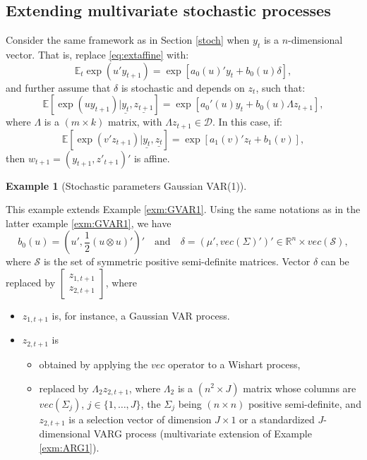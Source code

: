 \documentclass[
  12pt,
]{book}
\providecommand{\tightlist}{%
  \setlength{\itemsep}{0pt}\setlength{\parskip}{0pt}}
\theoremstyle{definition}
\theoremstyle{definition}
\newtheorem{example}{Example}[chapter]
\theoremstyle{definition}
\theoremstyle{definition}
\theoremstyle{remark}
\begin{document}
\hypertarget{extending-multivariate-stochastic-processes}{%
\subsection{Extending multivariate stochastic processes}\label{extending-multivariate-stochastic-processes}}

Consider the same framework as in Section \ref{stoch} when \(y_t\) is a \(n\)-dimensional vector. That is, replace \eqref{eq:extaffine} with:
\begin{equation}
\mathbb{E}_t   \exp(u' y_{t+1}) = \exp[a_0(u)'y_t+b_0(u)\delta],\label{eq:Multiextaffine}
\end{equation}
and further assume that \(\delta\) is stochastic and depends on \(z_t\), such that:
\[
\mathbb{E}[\exp(u y_{t+1})|\underline{y_t}, \underline{z_{t+1}}] = \exp[a_0'(u)y_t+b_0(u)\Lambda z_{t+1}],
\]
where \(\Lambda\) is a \((m\times k)\) matrix, with \(\Lambda z_{t+1} \in \mathcal{D}\). In this case, if:
\[
\mathbb{E}[\exp(v' z_{t+1})|\underline{y_t}, \underline{z_{t}}] = \exp[a_1(v)'z_t+b_1(v)],
\]
then \(w_{t+1} = (y_{t+1}, z'_{t+1})'\) is affine.

\begin{example}[Stochastic parameters Gaussian VAR(1)]
\protect\hypertarget{exm:RSVAR}{}\label{exm:RSVAR}

This example extends Example \ref{exm:GVAR1}. Using the same notations as in the latter example \ref{exm:GVAR1}, we have
\[
b_0(u) = \left(u', \frac{1}{2} (u \otimes u)'\right)' \quad \mbox{and} \quad\delta = (\mu', vec(\Sigma)')' \in \mathbb{R}^n \times vec(\mathcal{S}),
\]
where \(\mathcal{S}\) is the set of symmetric positive semi-definite matrices. Vector \(\delta\) can be replaced by \(\left[ \begin{array}{l} z_{1,t+1} \\ z_{2,t+1}\end{array} \right]\), where

\begin{itemize}
\tightlist
\item
  \(z_{1,t+1}\) is, for instance, a Gaussian VAR process.
\item
  \(z_{2,t+1}\) is

  \begin{itemize}
  \tightlist
  \item
    obtained by applying the \(vec\) operator to a Wishart process,
  \item
    replaced by \(\Lambda_2 z_{2,t+1}\), where \(\Lambda_2\) is a \((n^2 \times J)\) matrix whose columns are \(vec(\Sigma_j)\), \(j \in \{1,\dots,J\}\), the \(\Sigma_j\) being \((n \times n)\) positive semi-definite, and \(z_{2,t+1}\) is a selection vector of dimension \(J \times 1\) or a standardized \(J\)-dimensional VARG process (multivariate extension of Example \ref{exm:ARG1}).
  \end{itemize}
\end{itemize}

\end{example}
\end{document}
